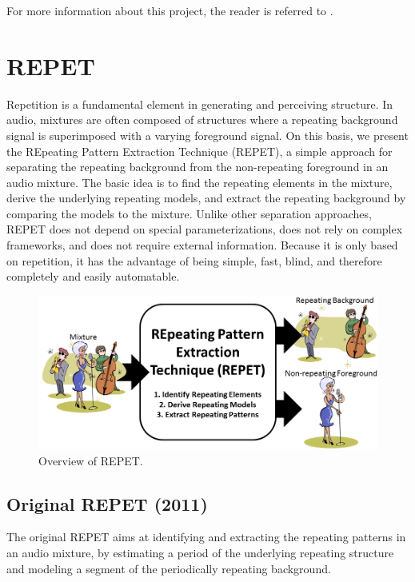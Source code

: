 \documentclass{article}
\begin{document}
For more information about this project, the reader is referred to \cite{article_rafii_nov2024}.


\section{REPET}
\label{sec:repet}

Repetition is a fundamental element in generating and perceiving structure. In audio, mixtures are often composed of structures where a repeating background signal is superimposed with a varying foreground signal. On this basis, we present the REpeating Pattern Extraction Technique (REPET), a simple approach for separating the repeating background from the non-repeating foreground in an audio mixture. The basic idea is to find the repeating elements in the mixture, derive the underlying repeating models, and extract the repeating background by comparing the models to the mixture. Unlike other separation approaches, REPET does not depend on special parameterizations, does not rely on complex frameworks, and does not require external information. Because it is only based on repetition, it has the advantage of being simple, fast, blind, and therefore completely and easily automatable.

\begin{figure}[!htb]
\centering
\includegraphics[width=\columnwidth]{Images/repet.png}
\caption{Overview of REPET.}
\label{fig:repet}
\end{figure}

\subsection{Original REPET (2011)}
\label{ssec:repet_original}

The original REPET aims at identifying and extracting the repeating patterns in an audio mixture, by estimating a period of the underlying repeating structure and modeling a segment of the periodically repeating background.
\end{document}
